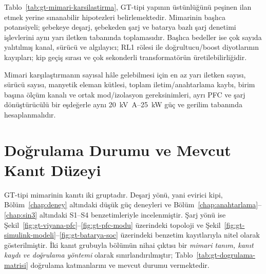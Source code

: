 Tablo~\ref{tab:gt-mimari-karsilastirma}, GT-tipi yapının üstünlüğünü peşinen ilan etmek yerine sınanabilir hipotezleri belirlemektedir. Mimarinin başlıca potansiyeli; şebekeye deşarj, şebekeden şarj ve batarya bazlı şarj denetimi işlevlerini aynı yarı iletken tabanında toplamasıdır. Başlıca bedeller ise çok sayıda yalıtılmış kanal, sürücü ve algılayıcı; RL1 rölesi ile doğrultucu/boost diyotlarının kayıpları; kip geçiş sırası ve çok sekonderli transformatörün üretilebilirliğidir.

Mimari karşılaştırmanın sayısal hâle gelebilmesi için en az yarı iletken sayısı, sürücü sayısı, manyetik eleman kütlesi, toplam iletim/anahtarlama kaybı, birim başına ölçüm kanalı ve ortak mod/izolasyon gereksinimleri, ayrı PFC ve şarj dönüştürücülü bir eşdeğerle aynı \SI{20}{\kilo\volt\ampere}--\SI{25}{\kilo\watt} güç ve gerilim tabanında hesaplanmalıdır.

\section{Doğrulama Durumu ve Mevcut Kanıt Düzeyi}
\label{sec:gt-dogrulama}

GT-tipi mimarinin kanıtı iki gruptadır. Deşarj yönü, yani evirici kipi, Bölüm~\ref{chap:deney} altındaki düşük güç deneyleri ve Bölüm~\ref{chap:anahtarlama}--\ref{chap:sin3} altındaki S1--S4 benzetimleriyle incelenmiştir. Şarj yönü ise Şekil~\ref{fig:gt-viyana-pfc}--\ref{fig:gt-pfc-modu} üzerindeki topoloji ve Şekil~\ref{fig:gt-simulink-modeli}--\ref{fig:gt-batarya-soc} üzerindeki benzetim kayıtlarıyla nitel olarak gösterilmiştir. İki kanıt grubuyla bölümün nihai çıktısı bir \emph{mimari tanım, kanıt kaydı ve doğrulama yöntemi} olarak sınırlandırılmıştır; Tablo~\ref{tab:gt-dogrulama-matrisi} doğrulama katmanlarını ve mevcut durumu vermektedir.

